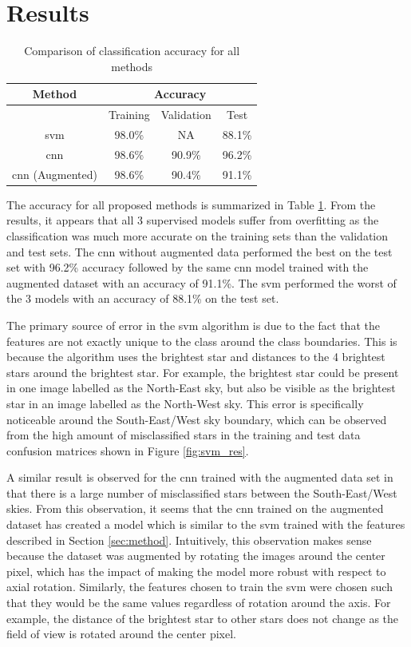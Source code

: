 \documentclass[10pt,twocolumn,letterpaper]{article}
\begin{document}
\section{Results}
\label{sec:results}

\begin{table}[H]
  \centering
  \begin{tabular}{*4c}
    \toprule
    Method & \multicolumn{3}{c}{Accuracy} \\
    \midrule
    {} & Training & Validation & Test \\
    \acrshort{svm} & 98.0\% & NA & 88.1\% \\
    \acrshort{cnn} & 98.6\% & 90.9\% & 96.2\% \\
    \acrshort{cnn} (Augmented) & 98.6\% & 90.4\% & 91.1\% \\
    \bottomrule
  \end{tabular}
  \caption{Comparison of classification accuracy for all methods}
  \label{tab:accuracy}
\end{table}

The accuracy for all proposed methods is summarized in Table \ref{tab:accuracy}. From the results, it appears that all 3 supervised models suffer from overfitting as the classification was much more accurate on the training sets than the validation and test sets. The \acrshort{cnn} without augmented data performed the best on the test set with 96.2\% accuracy followed by the same \acrshort{cnn} model trained with the augmented dataset with an accuracy of 91.1\%. The \acrshort{svm} performed the worst of the 3 models with an accuracy of 88.1\% on the test set.

The primary source of error in the \acrshort{svm} algorithm is due to the fact that the features are not exactly unique to the class around the class boundaries. This is because the algorithm uses the brightest star and distances to the 4 brightest stars around the brightest star. For example, the brightest star could be present in one image labelled as the North-East sky, but also be visible as the brightest star in an image labelled as the North-West sky. This error is specifically noticeable around the South-East/West sky boundary, which can be observed from the high amount of misclassified stars in the training and test data confusion matrices shown in Figure \ref{fig:svm_res}.

A similar result is observed for the \acrshort{cnn} trained with the augmented data set in that there is a large number of misclassified stars between the South-East/West skies. From this observation, it seems that the \acrshort{cnn} trained on the augmented dataset has created a model which is similar to the \acrshort{svm} trained with the features described in Section \ref{sec:method}. Intuitively, this observation makes sense because the dataset was augmented by rotating the images around the center pixel, which has the impact of making the model more robust with respect to axial rotation. Similarly, the features chosen to train the \acrshort{svm} were chosen such that they would be the same values regardless of rotation around the axis. For example, the distance of the brightest star to other stars does not change as the field of view is rotated around the center pixel.
\end{document}
